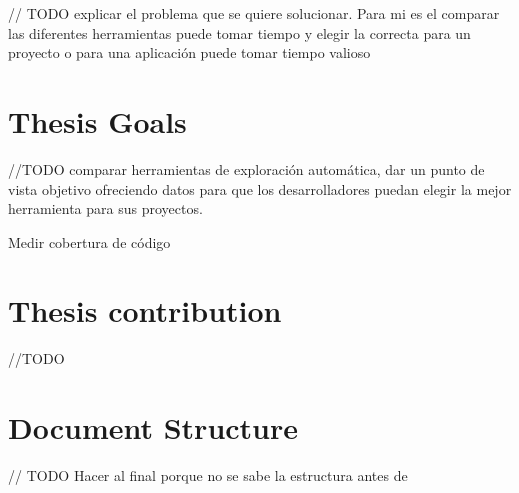 // TODO explicar el problema que se quiere solucionar. Para mi es el comparar las diferentes herramientas puede tomar tiempo y elegir la correcta para un proyecto o para una aplicación puede tomar tiempo valioso


\section{Thesis  Goals}

//TODO comparar herramientas de exploración automática, dar un punto de vista objetivo ofreciendo datos para que los desarrolladores puedan elegir la mejor herramienta para sus proyectos.

Medir cobertura de código



\section{Thesis contribution}

//TODO

\section{Document Structure}

// TODO Hacer al final porque no se sabe la estructura antes de

